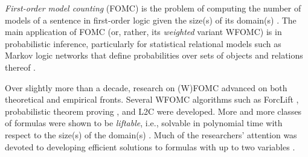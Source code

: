 

\emph{First-order model counting} (FOMC) is the problem of computing the number of models of a sentence in first-order logic given the size(s) of its domain(s) \citep{DBLP:conf/ijcai/BroeckTMDR11}. The main application of FOMC (or, rather, its \emph{weighted} variant WFOMC) is in probabilistic inference, particularly for statistical relational models such as Markov logic networks that define probabilities over sets of objects and relations thereof \citep{DBLP:conf/ijcai/BroeckTMDR11,DBLP:journals/cacm/GogateD16}.

Over slightly more than a decade, research on (W)FOMC advanced on both theoretical and empirical fronts. Several WFOMC algorithms such as ForcLift \citep{DBLP:conf/ijcai/BroeckTMDR11}, probabilistic theorem proving \citep{DBLP:journals/cacm/GogateD16}, and L2C \citep{DBLP:conf/kr/KazemiP16} were developed. More and more classes of formulas were shown to be \emph{liftable}, i.e., solvable in polynomial time with respect to the size(s) of the domain(s) \citep{DBLP:conf/kr/BremenK21,DBLP:conf/nips/KazemiKBP16,DBLP:conf/lics/KuusistoL18,DBLP:journals/jair/Kuzelka21}. Much of the researchers' attention was devoted to developing efficient solutions to formulas with up to two variables \citep{DBLP:conf/uai/BremenK21,DBLP:journals/corr/abs-2110-05992}.


